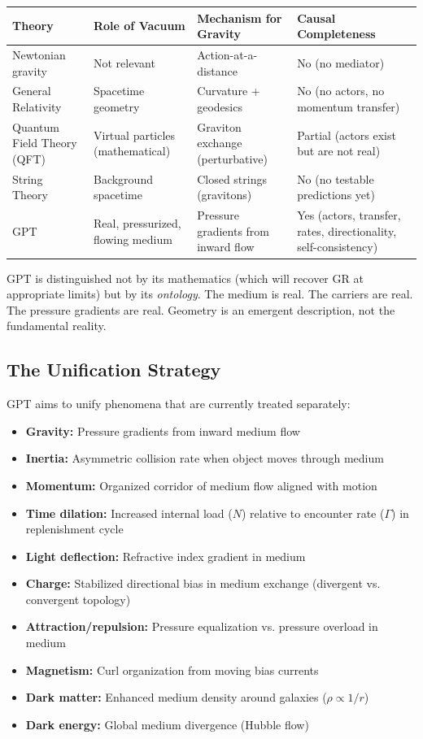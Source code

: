 \documentclass[12pt, a4paper]{article}
\begin{document}
\begin{center}
\begin{tabular}{|p{3.5cm}|p{3.5cm}|p{4cm}|p{3cm}|}
\hline
\textbf{Theory} & \textbf{Role of Vacuum} & \textbf{Mechanism for Gravity} & \textbf{Causal Completeness} \\
\hline
Newtonian gravity & Not relevant & Action-at-a-distance & No (no mediator) \\
\hline
General Relativity & Spacetime geometry & Curvature + geodesics & No (no actors, no momentum transfer) \\
\hline
Quantum Field Theory (QFT) & Virtual particles (mathematical) & Graviton exchange (perturbative) & Partial (actors exist but are not real) \\
\hline
String Theory & Background spacetime & Closed strings (gravitons) & No (no testable predictions yet) \\
\hline
GPT & Real, pressurized, flowing medium & Pressure gradients from inward flow & Yes (actors, transfer, rates, directionality, self-consistency) \\
\hline
\end{tabular}
\end{center}

GPT is distinguished not by its mathematics (which will recover GR at appropriate limits) but by its \textit{ontology}. The medium is real. The carriers are real. The pressure gradients are real. Geometry is an emergent description, not the fundamental reality.

\subsection{The Unification Strategy}
\label{subsec:unification_strategy}

GPT aims to unify phenomena that are currently treated separately:

\begin{itemize}
    \item \textbf{Gravity:} Pressure gradients from inward medium flow
    \item \textbf{Inertia:} Asymmetric collision rate when object moves through medium
    \item \textbf{Momentum:} Organized corridor of medium flow aligned with motion
    \item \textbf{Time dilation:} Increased internal load (\(N\)) relative to encounter rate (\(\Gamma\)) in replenishment cycle
    \item \textbf{Light deflection:} Refractive index gradient in medium
    \item \textbf{Charge:} Stabilized directional bias in medium exchange (divergent vs. convergent topology)
    \item \textbf{Attraction/repulsion:} Pressure equalization vs. pressure overload in medium
    \item \textbf{Magnetism:} Curl organization from moving bias currents
    \item \textbf{Dark matter:} Enhanced medium density around galaxies (\( \rho \propto 1/r \))
    \item \textbf{Dark energy:} Global medium divergence (Hubble flow)
\end{itemize}
\end{document}
